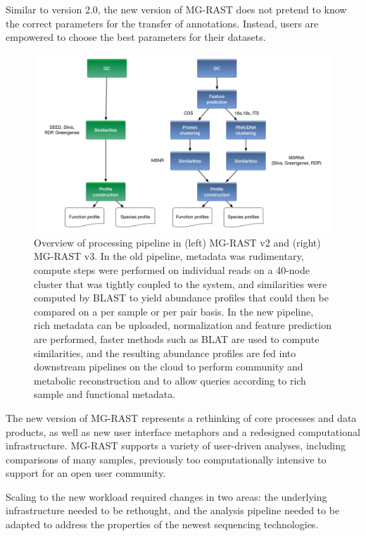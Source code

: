 \documentclass[12pt,fullpage]{report}
\begin{document}
Similar to version 2.0, the new version of MG-RAST does not pretend to know the correct parameters for the transfer of annotations. Instead, users are empowered to choose the best parameters for their datasets.

\begin{figure}
\begin{center}
\includegraphics[width=6in]{Images/mgrastv2VSv3.png}
\end{center}
\caption{
Overview of processing pipeline in (left) MG-RAST v2 and (right) MG-RAST v3. In the old pipeline, metadata was rudimentary, compute steps were performed on individual reads on a 40-node cluster that was tightly coupled to the system, and similarities were computed by BLAST to yield abundance profiles that could then be compared on a per sample or per pair basis. In the new pipeline, rich metadata can be uploaded, normalization and feature prediction are performed, faster methods such as BLAT are used to compute similarities, and the resulting abundance profiles are fed into downstream pipelines on the cloud to perform community and metabolic reconstruction and to allow queries according to rich sample and functional metadata.
}
\label{fig:mgrastv2VSv3}
\end{figure}

The new version of MG-RAST represents a rethinking of core processes and data products, as well as new user interface metaphors and a redesigned computational infrastructure. MG-RAST supports a variety of user-driven analyses, including comparisons of many samples, previously too computationally intensive to support for an open user community.

Scaling to the new workload required changes in two areas: the underlying infrastructure needed to be rethought, and the analysis pipeline needed to be adapted to address the properties of the newest sequencing technologies.
\end{document}
